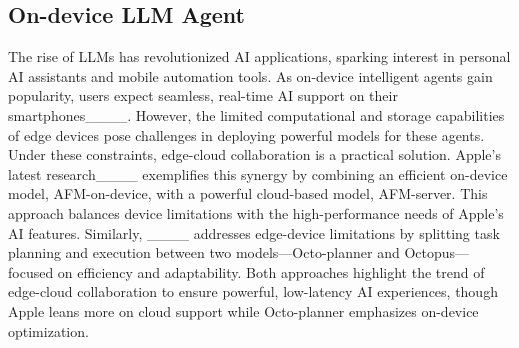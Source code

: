 \subsection{On-device LLM Agent}
The rise of LLMs has revolutionized AI applications, sparking interest in personal AI assistants and mobile automation tools. As on-device intelligent agents gain popularity, users expect seamless, real-time AI support on their smartphones____. However, the limited computational and storage capabilities of edge devices pose challenges in deploying powerful models for these agents. Under these constraints, edge-cloud collaboration is a practical solution.
Apple's latest research____ exemplifies this synergy by combining an efficient on-device model, AFM-on-device, with a powerful cloud-based model, AFM-server. This approach balances device limitations with the high-performance needs of Apple’s AI features. Similarly, ____ addresses edge-device limitations by splitting task planning and execution between two models—Octo-planner and Octopus—focused on efficiency and adaptability. Both approaches highlight the trend of edge-cloud collaboration to ensure powerful, low-latency AI experiences, though Apple leans more on cloud support while Octo-planner emphasizes on-device optimization.

